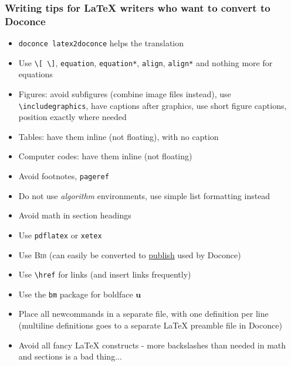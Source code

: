 \documentclass{beamer}
\newcounter{doconce:exercise:counter}
\newcounter{doconce:movie:counter}
\begin{document}
\begin{frame}
\frametitle{Writing tips for {\LaTeX} writers who want to convert to Doconce}

\begin{itemize}
 \item \Verb!doconce latex2doconce! helps the translation

 \item Use \Verb!\[ \]!, \Verb!equation!, \Verb!equation*!, \Verb!align!, \Verb!align*! and nothing more for
   equations

 \item Figures: avoid subfigures (combine image files instead), use \Verb!\includegraphics!, have captions after graphics, use short figure captions, position exactly where needed

 \item Tables: have them inline (not floating), with no caption

 \item Computer codes: have them inline (not floating)

 \item Avoid footnotes, \Verb!pageref!

 \item Do not use \emph{algorithm} environments, use simple list formatting instead

 \item Avoid math in section headings

 \item Use \Verb!pdflatex! or \Verb!xetex!

 \item Use \textsc{Bib}\negthinspace{\TeX} (can easily be converted to \href{{https://bitbucket.org/logg/publish}}{publish} used by Doconce)

 \item Use \Verb!\href! for links (and insert links frequently)

 \item Use the \Verb!bm! package for boldface $\bm{u}$

 \item Place all newcommands in a separate file, with one definition per line
   (multiline definitions goes to a separate {\LaTeX} preamble file in Doconce)

 \item Avoid all fancy {\LaTeX} constructs - more backslashes than needed in math
   and sections is a bad thing...
\end{itemize}

\noindent
\end{frame}
\end{document}
